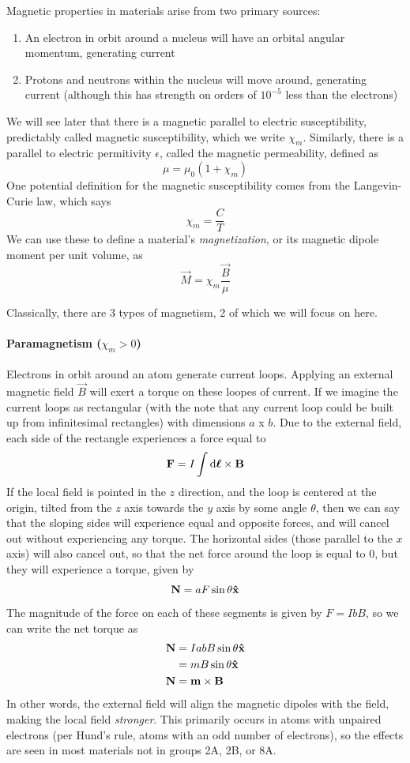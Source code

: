 \documentclass[a4paper]{article}
\begin{document}
Magnetic properties in materials arise from two primary sources:
\begin{enumerate}
	\item An electron in orbit around a nucleus will have an orbital
		angular momentum, generating current
	\item Protons and neutrons within the nucleus will move around,
		generating current (although this has strength on orders of
		$10^{-5}$ less than the electrons)
\end{enumerate}
We will see later that there is a magnetic parallel to electric susceptibility,
predictably called magnetic susceptibility, which we write $\chi_m$.
Similarly, there is a parallel to electric permitivity $\epsilon$, called
the magnetic permeability, defined as
\[ \mu = \mu_0(1+\chi_m) \]
One potential definition for the magnetic susceptibility comes from the
Langevin-Curie law, which says
\[ \chi_m = \frac{C}{T} \]
We can use these to define a material's \emph{magnetization}, or
its magnetic dipole moment per unit volume, as
\[ \vec{M} = \chi_m\frac{\vec{B}}{\mu} \]

Classically, there are 3 types of magnetism, 2 of which we will focus on here.

\paragraph{Paramagnetism ($\chi_m > 0$)}
Electrons in orbit around an atom generate current loops. Applying an external
magnetic field $\vec{B}$ will exert a torque on these loopes of current. If we
imagine the current loops as rectangular (with the note that any current loop
could be built up from infinitesimal rectangles) with dimensions $a$ x $b$.
Due to the external field,
each side of the rectangle experiences a force equal to
\[ \boldsymbol{\mathbf{F}} = I\int\mathrm{d}\boldsymbol{\mathbf{\ell}}\times\boldsymbol{\mathbf{B}} \]
If the local field is pointed in the $z$ direction, and the loop is centered at
the origin, tilted from the $z$ axis towards the $y$ axis by some angle
$\theta$, then we can say that the sloping sides will experience equal and
opposite forces, and will cancel out without experiencing any torque. The
horizontal sides (those parallel to the $x$ axis) will also cancel out, so that
the net force around the loop is equal to 0, but they will experience a torque,
given by
\[ \boldsymbol{\mathbf{N}} = aF\sin\theta\boldsymbol{\mathbf{\hat{x}}} \]
The magnitude of the force on each of these segments is given by
$F = IbB$, so we can write the net torque as
\begin{align*}
	\boldsymbol{\mathbf{N}} &= IabB\sin\theta\boldsymbol{\mathbf{\hat{x}}}\\
		&= mB\sin\theta\boldsymbol{\mathbf{\hat{x}}}\\
	\boldsymbol{\mathbf{N}} &= \boldsymbol{\mathbf{m}}\times\boldsymbol{\mathbf{B}}
\end{align*}
In other words, the external field will align the magnetic dipoles with the
field, making the local field \emph{stronger}. This primarily occurs in
atoms with unpaired electrons (per Hund's rule, atoms with an odd number of
electrons), so the effects are seen in most materials not in groups 2A, 2B,
or 8A.
\end{document}
